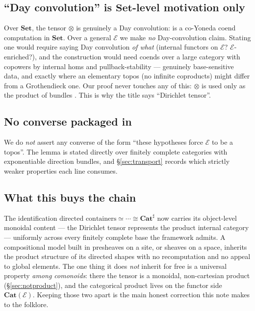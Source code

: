 \documentclass[11pt]{amsart}
\theoremstyle{plain}
\theoremstyle{definition}
\theoremstyle{remark}
\newcommand{\Set}{\mathbf{Set}}
\newcommand{\Cat}{\mathbf{Cat}}
\newcommand{\Ee}{\mathcal{E}}
\begin{document}
\subsection*{``Day convolution'' is $\Set$-level motivation only}
Over $\Set$, the tensor $\otimes$ is genuinely a Day convolution: \cite[Prop.~3.79]{NiuSpivak2023} is
a co-Yoneda coend computation in $\Set$. Over a general $\Ee$ we make \emph{no} Day-convolution claim.
Stating one would require saying Day convolution \emph{of what} (internal functors on $\Ee$?
$\Ee$-enriched?), and the construction would need coends over a large category with copowers by
internal homs and pullback-stability --- genuinely base-sensitive data, and exactly where an
elementary topos (no infinite coproducts) might differ from a Grothendieck one. Our proof never
touches any of this: $\otimes$ is used only as the product of bundles \cite[Def.~4.1]{ShapiroSpivak2023}.
This is why the title says ``Dirichlet tensor''.

\subsection*{No converse packaged in}
We do \emph{not} assert any converse of the form ``these hypotheses force $\Ee$ to be a topos''. The
lemma is stated directly over finitely complete categories with exponentiable direction bundles,
and \S\ref{sec:transport} records which strictly weaker properties each line consumes.

\subsection*{What this buys the chain}
The identification $\text{directed containers}\simeq\cdots\cong\Cat^{\sharp}$ now carries its
object-level monoidal content --- the Dirichlet tensor represents the product internal category ---
uniformly across every finitely complete base the framework admits. A compositional model built in presheaves on a site, or sheaves on
a space, inherits the product structure of its directed shapes with no recomputation and no appeal to
global elements. The one thing it does \emph{not} inherit for free is a universal property \emph{among
comonoids}: there the tensor is a monoidal, non-cartesian product (\S\ref{sec:notproduct}), and the
categorical product lives on the functor side $\Cat(\Ee)$. Keeping those two apart is the main honest
correction this note makes to the folklore.
\end{document}
